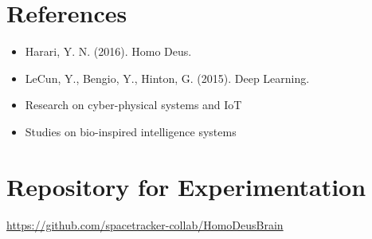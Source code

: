 \documentclass[12pt]{article}
\begin{document}
\section{References}

\begin{itemize}
\item Harari, Y. N. (2016). Homo Deus.
\item LeCun, Y., Bengio, Y., Hinton, G. (2015). Deep Learning.
\item Research on cyber-physical systems and IoT
\item Studies on bio-inspired intelligence systems
\end{itemize}

\section{Repository for Experimentation}

\noindent
\url{https://github.com/spacetracker-collab/HomoDeusBrain}
\end{document}
